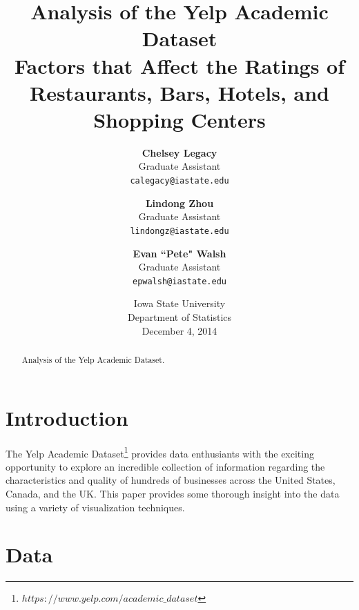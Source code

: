 \documentclass[11pt]{article}
\begin{document}
\author{
\textbf{Chelsey Legacy} \\
Graduate Assistant \\
\texttt{calegacy@iastate.edu}
\and
\textbf{Lindong Zhou} \\
Graduate Assistant \\
\texttt{lindongz@iastate.edu}
\and
\textbf{Evan ``Pete" Walsh} \\
Graduate Assistant \\
\texttt{epwalsh@iastate.edu}
}
\title{
\textbf{Analysis of the Yelp Academic Dataset}\\
Factors that Affect the Ratings of Restaurants, Bars, Hotels, and Shopping Centers}
\date{
{\LARGE Iowa State University} \\
Department of Statistics \\
December 4, 2014}
\maketitle

\begin{abstract}
Analysis of the Yelp Academic Dataset.
\end{abstract}

\newpage

\tableofcontents

\newpage

\pagestyle{fancy}
\rhead{\thepage}
\rfoot{\today}
\cfoot{}%


\section{Introduction}

The Yelp Academic Dataset\footnote{$https://www.yelp.com/academic\_dataset$} provides data enthusiants with the exciting opportunity to explore an incredible collection of information regarding the characteristics and quality of hundreds of businesses across the United States, Canada, and the UK. This paper provides some thorough insight into the data using a variety of visualization techniques.


\section{Data}
\end{document}
